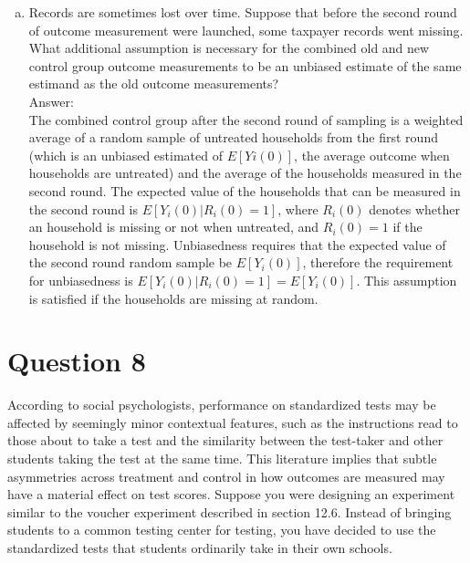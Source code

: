 \documentclass[11pt,notitlepage]{article}\usepackage[]{graphicx}\usepackage[]{color}
\begin{document}
\begin{enumerate}[a)]
\item Records are sometimes lost over time. Suppose that before the second round of outcome measurement were launched, some taxpayer records went missing. What additional assumption is necessary for the combined old and new control group outcome measurements to be an unbiased estimate of the same estimand as the old outcome measurements?\\
Answer:\\
The combined control group after the second round of sampling is a weighted average of a random sample of untreated households from the first round (which is an unbiased estimated of $E[Yi(0)]$, the average outcome when households are untreated) and the average of the households measured in the second round. The expected value of the households that can be measured in the second round is $E[Y_i(0)|R_i(0)=1]$, where $R_i(0)$ denotes whether an household is missing or not when untreated, and $R_i(0)=1$ if the household is not missing. Unbiasedness requires that the expected value of the second round random sample be $E[Y_i(0)]$, therefore the requirement for unbiasedness is $E[Y_i(0)|R_i(0)=1] = E[Y_i(0)]$. This assumption is satisfied if the households are missing at random. 
\end{enumerate}
\section*{Question 8}
According to social psychologists, performance on standardized tests may be affected by seemingly minor contextual features, such as the instructions read to those about to take a test and the similarity between the test-taker and other students taking the test at the same time. This literature implies that subtle asymmetries across treatment and control in how outcomes are measured may have a material effect on test scores. Suppose you were designing an experiment similar to the voucher experiment described in section 12.6. Instead of bringing students to a common testing center for testing, you have decided to use the standardized tests that students ordinarily take in their own schools.
\end{document}
